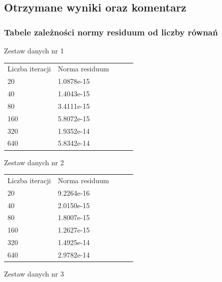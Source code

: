 \documentclass[11pt]{article} %
\begin{document}
\subsection{Otrzymane wyniki oraz komentarz}
\subsubsection{Tabele zależności normy residuum od liczby równań}
Zestaw danych nr 1

\begin{table}[h]
\begin{tabular}{|l|l|lll}
\cline{1-2}
Liczba iteracji & Norma residuum &  &  &  \\ \cline{1-2}
20             & 1.0878e-15            &  &  &  \\ \cline{1-2}
40             & 1.4043e-15            &  &  &  \\ \cline{1-2}
80            & 3.4111e-15                &  &  &  \\ \cline{1-2}
160            &  5.8072e-15              &  &  &  \\ \cline{1-2}
320            & 1.9352e-14               &  &  &  \\ \cline{1-2}
640            &  5.8342e-14              &  &  &  \\ \cline{1-2}
\end{tabular}
\end{table}

Zestaw danych nr 2

\begin{table}[h]
\begin{tabular}{|l|l|lll}
\cline{1-2}
Liczba iteracji & Norma residuum &  &  &  \\ \cline{1-2}
20             & 9.2264e-16           &  &  &  \\ \cline{1-2}
40             &  2.0150e-15            &  &  &  \\ \cline{1-2}
80            & 1.8007e-15                &  &  &  \\ \cline{1-2}
160            &  1.2627e-15              &  &  &  \\ \cline{1-2}
320            & 1.4925e-14               &  &  &  \\ \cline{1-2}
640            &  2.9782e-14              &  &  &  \\ \cline{1-2}
\end{tabular}
\end{table}

Zestaw danych nr 3
\end{document}
